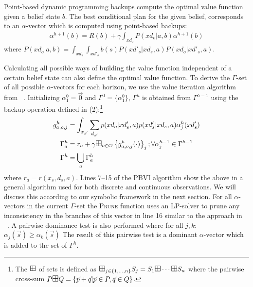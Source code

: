 \documentclass{article} %
\begin{document}
Point-based dynamic programming backups compute the optimal value function given a belief state $b$. The best conditional plan for the given belief, corresponds to an $\alpha$-vector which is computed using point-based backups: 
{\footnotesize
\begin{align*}
\alpha^{h+1}(b) = R(b) + \gamma \int_{xd_o} P(xd_o|a,b)\alpha^{h+1}(b)\nonumber
\end{align*}
}
where $P(xd_o|a,b) = \int_{xd_s}\int_{xd'_s}b(s)P(xd'_s|xd_s,a)P(xd_o|xd'_s,a)$.

Calculating all possible ways of building the value function independent of a certain belief state can also define the optimal value function. To derive the $\Gamma$-set of all possible $\alpha$-vectors for each horizon, we use the value iteration algorithm from ~\cite{monahan82}. Initializing  $\alpha^0_1 = \vec{0}$ and $\Gamma^0 = \{ \alpha^0_1 \}$, $\Gamma^h$ is obtained from $\Gamma^{h-1}$ using the backup operation defined in (2):\footnote{The $\textrm{\large $\boxplus$}$ of sets is defined as 
$\textrm{\large $\boxplus$}_{j \in \{ 1,\ldots, n \} } S_j = S_1 \textrm{\large $\boxplus$} \cdots \textrm{\large $\boxplus$} S_n$ where the pairwise cross-sum $P 
\textrm{\large $\boxplus$} Q = \{ \vec{p} + \vec{q} | \vec{p} \in P, \vec{q} \in Q \}$.}
{\footnotesize
\begin{align}
g^h_{a,o,j} &=  \int_{x_{s'}} \sum_{d_{s'}} p(xd_o|xd'_s,a)p(xd'_s|xd_s,a) \alpha^h_j(xd'_s) \\
\Gamma^{h}_a   &= r_a + \gamma \textrm{\large $\boxplus$}_{o \in \mathcal{O}} \left\{ g^h_{a,o,j}(\cdot) \right\}_j ;  \forall \alpha^{h-1}_{j} \in \Gamma^{h-1}  \\
\Gamma^h  &= \bigcup_a \Gamma^h_a 
\end{align}
}
where $r_a = r(x_s,d_s,a)$.  
Lines 7--15 of the \textsc{PBVI} algorithm show the above in a general algorithm used for both discrete and continuous observations. We will discuss this according to our symbolic framework in the next section. 
For all $\alpha$-vectors in the current $\Gamma$-set the \textsc{Prune} function uses an LP-solver to prune any inconsistency in the branches of this vector in line 16 similar to the approach in ~\cite{penberthy94}. A pairwise dominance test is also performed where for all $j,k$: $\alpha_j(\vec{s}) \geq \alpha_k(\vec{s})$
The result of this pairwise test is a dominant $\alpha$-vector which is added to the set of $\Gamma^h$. 
\end{document}
